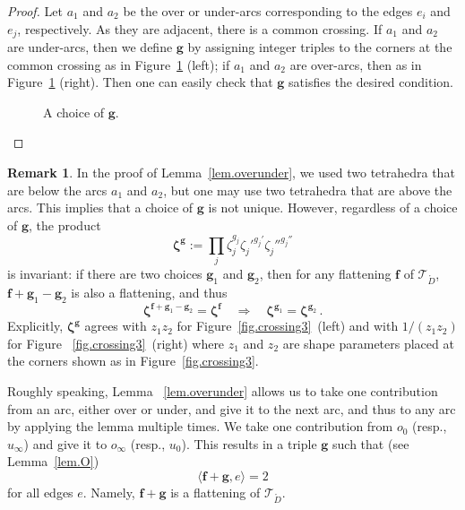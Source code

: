 \documentclass[12pt,reqno]{amsart}
\theoremstyle{definition}
\newtheorem{remark}[theorem]{Remark}
\def\calT{\mathcal T}
\renewcommand{\Ddot}{\mathring{D}}
\begin{document}
\begin{proof}
Let $a_1$ and $a_2$ be the over or under-arcs corresponding to the edges $e_i$ and
$e_j$, respectively. As they are adjacent, there is a common crossing. If $a_1$ and
$a_2$ are under-arcs,  then we define $\boldsymbol g$ by assigning integer triples to
the corners at the common crossing as in Figure~\ref{fig.crossing4} (left); if $a_1$
and $a_2$ are over-arcs, then as in Figure~\ref{fig.crossing4} (right). Then one can
easily check that $\boldsymbol g$ satisfies the desired condition.

\begin{figure}[htpb!]

\caption{A choice of $\boldsymbol g$.}
\label{fig.crossing4}
\end{figure}
\end{proof}

\begin{remark}
\label{rmk.ratio}
In the proof of Lemma~\ref{lem.overunder}, we used two tetrahedra that are below
the arcs $a_1$ and $a_2$, but one may use two tetrahedra that are above the arcs. This
implies that a choice of $\boldsymbol g$ is not unique. However, regardless of a
choice of $\boldsymbol g$, the product 
\begin{equation*}
{\boldsymbol \zeta}^{\boldsymbol g}:=
\prod_{j}\zeta_j^{g_j} {\zeta_j'}^{g_j'} {\zeta_j''}^{g_j''}
\end{equation*}
is invariant: if there are two choices $\boldsymbol g_1$ and $\boldsymbol g_2$, then
for any flattening $\boldsymbol f$ of $\calT_{\Ddot}$,
$\boldsymbol f + \boldsymbol g_1 - \boldsymbol g_2$ is also a flattening, and thus
\begin{equation*}
  {\boldsymbol \zeta}^{\boldsymbol f + \boldsymbol g_1 -\boldsymbol g_2} =
  {\boldsymbol \zeta}^{\boldsymbol f}  \quad \Rightarrow \quad
  {\boldsymbol \zeta}^{\boldsymbol g_1 }= {\boldsymbol \zeta}^{\boldsymbol g_2} \,.
\end{equation*}
Explicitly, ${\boldsymbol \zeta}^{\boldsymbol g}$ agrees with $z_1z_2$ for
Figure~\ref{fig.crossing3}~(left) and with $1/(z_1z_2)$ for Figure
~\ref{fig.crossing3}~(right) where $z_1$ and $z_2$ are shape parameters placed at
the corners shown as in Figure~\ref{fig.crossing3}.
\end{remark}

Roughly speaking, Lemma ~\ref{lem.overunder} allows us to take one contribution
from an arc, either over or under, and give it to the next arc, and thus to any arc
by applying the lemma multiple times. We take one contribution from $o_0$ (resp.,
$u_\infty$) and give it to $o_\infty$ (resp., $u_0$). This results in a triple
$\boldsymbol g$ such that (see Lemma~\ref{lem.O})
\begin{equation*}
\langle \boldsymbol f+\boldsymbol g , e \rangle  = 2
\end{equation*}
for all edges $e$. Namely, $\boldsymbol f+\boldsymbol g $ is a flattening of
$\calT_{\Ddot}$.
\end{document}
